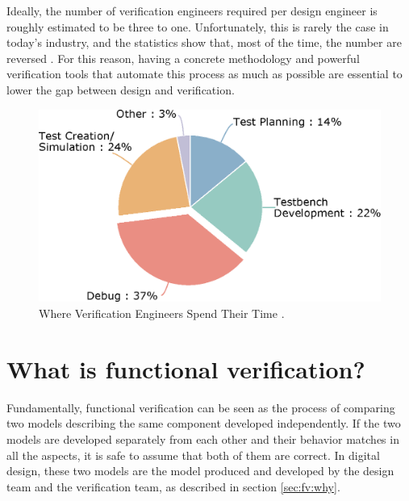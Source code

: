 \par Ideally, the number of verification engineers required per design engineer
is roughly estimated to be three to one. Unfortunately, this is rarely the case
in today's industry, and the statistics show that, most of the time, the number
are reversed \cite{foster2015trends}. For this reason, having a concrete
methodology and powerful verification tools that automate this process as much
as possible are essential to lower the gap between design and verification.

\begin{figure}[htb]
\centering
\includegraphics[width=0.8\linewidth]{pictures/Where_verification_engineers_spend_time.eps}
\caption{Where Verification Engineers Spend Their Time \cite{foster2015trends}.}
\label{fig:whereverificationengineersspendtheirtime}
\end{figure}

\section{What is functional verification?}
Fundamentally, functional verification can be seen as the process of comparing
two models describing the same component developed independently. If the two
models are developed separately from each other and their behavior matches in
all the aspects, it is safe to assume that both of them are correct. In digital
design, these two models are the model produced and developed by the design team
and the verification team, as described in section \ref{sec:fv:why}.

